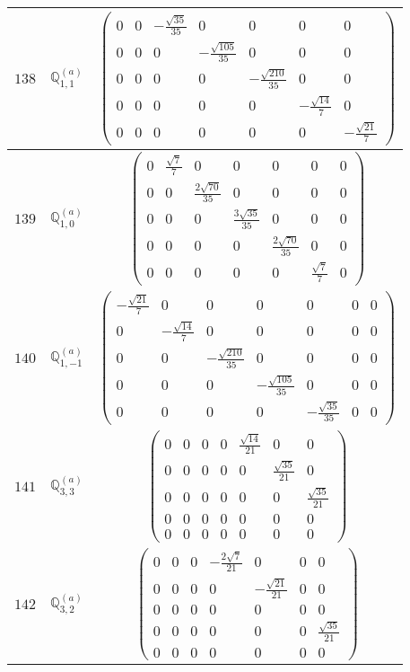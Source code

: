 \documentclass[fleqn,8pt,landscape]{jsarticle}
\begin{document}
\begin{center}
\begin{longtable}{ccc}
$ 138 $ & $ \mathbb{Q}_{1,1}^{(a)} $ & $ \begin{pmatrix} 0 & 0 & - \frac{\sqrt{35}}{35} & 0 & 0 & 0 & 0 \\ 0 & 0 & 0 & - \frac{\sqrt{105}}{35} & 0 & 0 & 0 \\ 0 & 0 & 0 & 0 & - \frac{\sqrt{210}}{35} & 0 & 0 \\ 0 & 0 & 0 & 0 & 0 & - \frac{\sqrt{14}}{7} & 0 \\ 0 & 0 & 0 & 0 & 0 & 0 & - \frac{\sqrt{21}}{7} \end{pmatrix} $ \\ \hline
$ 139 $ & $ \mathbb{Q}_{1,0}^{(a)} $ & $ \begin{pmatrix} 0 & \frac{\sqrt{7}}{7} & 0 & 0 & 0 & 0 & 0 \\ 0 & 0 & \frac{2 \sqrt{70}}{35} & 0 & 0 & 0 & 0 \\ 0 & 0 & 0 & \frac{3 \sqrt{35}}{35} & 0 & 0 & 0 \\ 0 & 0 & 0 & 0 & \frac{2 \sqrt{70}}{35} & 0 & 0 \\ 0 & 0 & 0 & 0 & 0 & \frac{\sqrt{7}}{7} & 0 \end{pmatrix} $ \\ \hline
$ 140 $ & $ \mathbb{Q}_{1,-1}^{(a)} $ & $ \begin{pmatrix} - \frac{\sqrt{21}}{7} & 0 & 0 & 0 & 0 & 0 & 0 \\ 0 & - \frac{\sqrt{14}}{7} & 0 & 0 & 0 & 0 & 0 \\ 0 & 0 & - \frac{\sqrt{210}}{35} & 0 & 0 & 0 & 0 \\ 0 & 0 & 0 & - \frac{\sqrt{105}}{35} & 0 & 0 & 0 \\ 0 & 0 & 0 & 0 & - \frac{\sqrt{35}}{35} & 0 & 0 \end{pmatrix} $ \\ \hline
$ 141 $ & $ \mathbb{Q}_{3,3}^{(a)} $ & $ \begin{pmatrix} 0 & 0 & 0 & 0 & \frac{\sqrt{14}}{21} & 0 & 0 \\ 0 & 0 & 0 & 0 & 0 & \frac{\sqrt{35}}{21} & 0 \\ 0 & 0 & 0 & 0 & 0 & 0 & \frac{\sqrt{35}}{21} \\ 0 & 0 & 0 & 0 & 0 & 0 & 0 \\ 0 & 0 & 0 & 0 & 0 & 0 & 0 \end{pmatrix} $ \\ \hline
$ 142 $ & $ \mathbb{Q}_{3,2}^{(a)} $ & $ \begin{pmatrix} 0 & 0 & 0 & - \frac{2 \sqrt{7}}{21} & 0 & 0 & 0 \\ 0 & 0 & 0 & 0 & - \frac{\sqrt{21}}{21} & 0 & 0 \\ 0 & 0 & 0 & 0 & 0 & 0 & 0 \\ 0 & 0 & 0 & 0 & 0 & 0 & \frac{\sqrt{35}}{21} \\ 0 & 0 & 0 & 0 & 0 & 0 & 0 \end{pmatrix} $ \\ \hline

\end{longtable}
\end{center}
\end{document}
